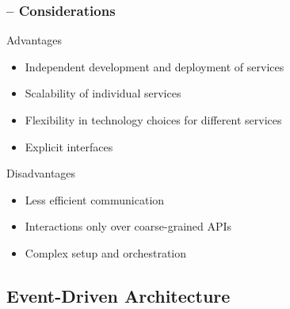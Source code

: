 \begin{frame}
    \frametitle{\insertsubsection{} -- Considerations}
    \begin{fancycolumns}[widths={45,55}]
        \begin{motivation}{Advantages}
            \begin{itemize}
                \item Independent development and deployment of services
                \item Scalability of individual services
                \item Flexibility in technology choices for different services
                \item Explicit interfaces
            \end{itemize}
        \end{motivation}
        \begin{note}{Disadvantages}
            \begin{itemize}
                \item Less efficient communication
                \item Interactions only over coarse-grained APIs
                \item Complex setup and orchestration
            \end{itemize}
        \end{note}
        \nextcolumn
        \microservicesdefault{}
    \end{fancycolumns}
\end{frame}



\subsection{Event-Driven Architecture} %

